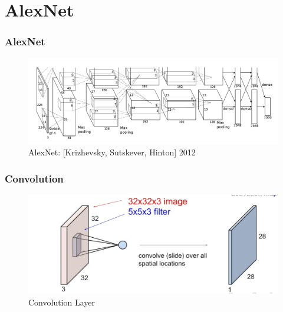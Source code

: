 \documentclass{beamer}
\begin{document}
\section{AlexNet}
\begin{frame}
\frametitle{AlexNet}

	\begin{figure}
		\includegraphics[width=\linewidth]{Pics/alexnet.png}
		\caption{AlexNet: [Krizhevsky, Sutskever, Hinton] 2012}
	\end{figure}

\end{frame}
\begin{frame}
\frametitle{Convolution}

\begin{figure}
	\includegraphics[width=\linewidth]{Pics/cnlayer.png}
	\caption{Convolution Layer}
\end{figure}

\end{frame}
\end{document}
